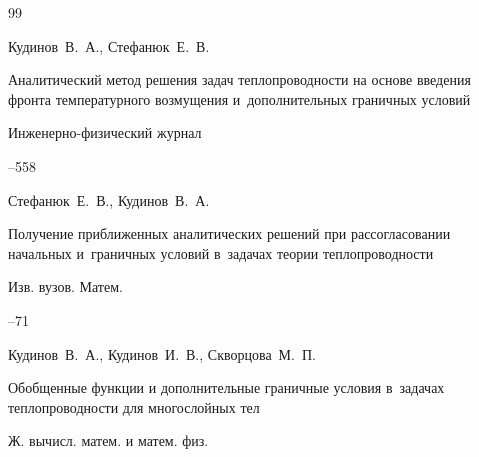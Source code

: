 \begin{thebibliography}{99}




\by Кудинов~В.~А., Стефанюк~Е.~В.

\paper Аналитический метод решения задач теплопроводности на основе введения фронта температурного возмущения и~дополнительных граничных условий

\jour Инженерно-физический журнал




--558





\by Стефанюк~Е.~В., Кудинов~В.~А.

\paper Получение приближенных аналитических решений при рассогласовании начальных и~граничных условий в~задачах теории теплопроводности

\jour Изв. вузов. Матем.



--71














\by Кудинов~В.~А., Кудинов~И.~В., Скворцова~М.~П.

\paper Обобщенные функции и дополнительные граничные условия в~задачах теплопроводности для многослойных тел

\jour Ж. вычисл. матем. и матем. физ.



\end{thebibliography}
